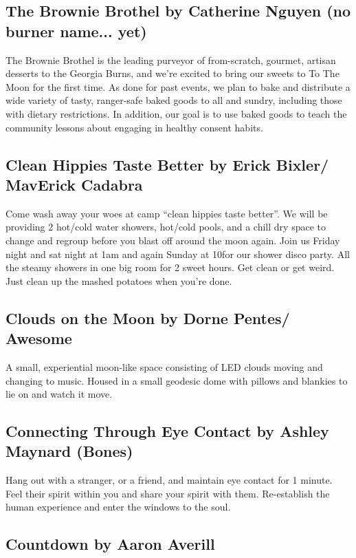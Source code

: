 \begin{multicols}{2}
\subsection*{The Brownie Brothel by Catherine Nguyen (no burner name... yet)        }
The Brownie Brothel is the leading purveyor of from-scratch, gourmet, artisan desserts to the Georgia Burns, and we're excited to bring our sweets to To The Moon for the first time. As done for past events, we plan to bake and distribute a wide variety of tasty, ranger-safe baked goods to all and sundry, including those with dietary restrictions. In addition, our goal is to use baked goods to teach the community lessons about engaging in healthy consent habits.


\subsection*{Clean Hippies Taste Better         by Erick Bixler/ MavErick Cadabra         }
Come wash away your woes at camp “clean hippies taste better”. We will be providing 2 hot/cold water showers, hot/cold pools, and a chill dry space to change and regroup before you blast off around the moon again. Join us Friday night and sat night at 1am and again Sunday at 10\pm for our shower disco party. All the steamy showers in one big room for 2 sweet hours. Get clean or get weird. Just clean up the mashed potatoes when you’re done.         


\subsection*{Clouds on the Moon by Dorne Pentes/ Awesome                }
A small, experiential moon-like space consisting of LED clouds moving and changing to music. Housed in a small geodesic dome with pillows and blankies to lie on and watch it move.


\subsection*{Connecting Through Eye Contact by Ashley Maynard (Bones)                }
Hang out with a stranger, or a friend, and maintain eye contact for 1 minute.  Feel their spirit within you and share your spirit with them.  Re-establish the human experience and enter the windows to the soul.         

\subsection*{Countdown by Aaron Averill}


\end{multicols}
